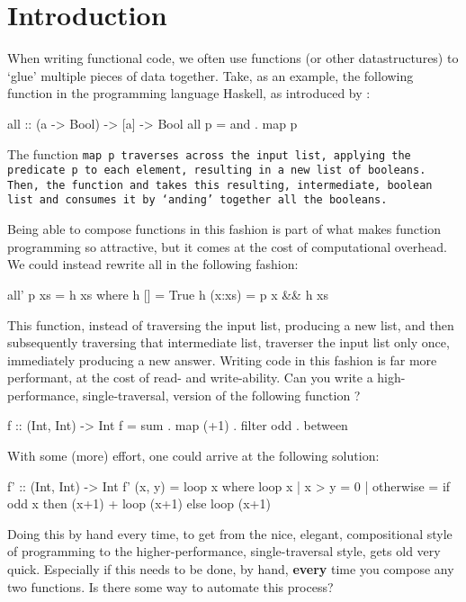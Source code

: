 \section{Introduction}
When writing functional code, we often use functions (or other datastructures) to `glue' multiple pieces of data together.
Take, as an example, the following function in the programming language Haskell, as introduced by \cite{Gill1993}: %
\begin{code}
    all :: (a -> Bool) -> [a] -> Bool
    all p = and . map p
\end{code}
The function \tt{map p} traverses across the input list, applying the predicate \tt{p} to each element, resulting in a new list of booleans. Then, the function \tt{and} takes this resulting, intermediate, boolean list and consumes it by `anding' together all the booleans.



Being able to compose functions in this fashion is part of what makes function programming so attractive, but it comes at the cost of computational overhead. We could instead rewrite all in the following fashion:
\begin{code}
all' p xs = h xs
      where h []     = True
            h (x:xs) = p x && h xs
\end{code}
This function, instead of traversing the input list, producing a new list, and then subsequently traversing that intermediate list, traverser the input list only once, immediately producing a new answer. Writing code in this fashion is far more performant, at the cost of read- and write-ability.
Can you write a high-performance, single-traversal, version of the following function \citep{Harper2011}?
\begin{code}
    f :: (Int, Int) -> Int
    f = sum . map (+1) . filter odd . between
\end{code}
With some (more) effort, one could arrive at the following solution:
\begin{code}
    f' :: (Int, Int) -> Int
    f' (x, y) = loop x
      where loop x | x > y     = 0
                   | otherwise = if odd x
                                 then (x+1) + loop (x+1)
                                 else loop (x+1)
\end{code}
Doing this by hand every time, to get from the nice, elegant, compositional style of programming to the higher-performance, single-traversal style, gets old very quick. Especially if this needs to be done, by hand, \textbf{every} time you compose any two functions.
Is there some way to automate this process?

